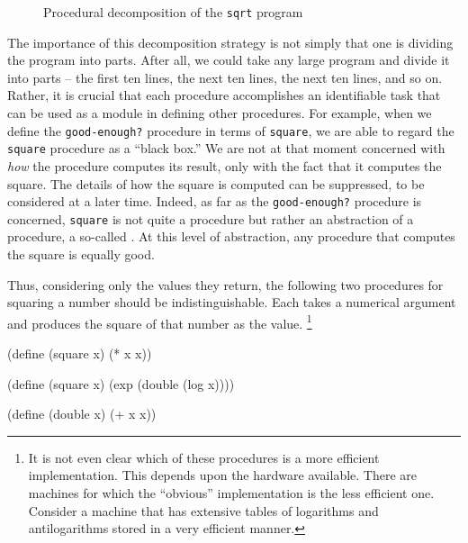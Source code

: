 \begin{schemedisplay}
\begin{figure}
  \caption{Procedural decomposition of the \texttt{sqrt} program}
  \label{fig:1.2}
\end{figure}
          
            
The importance of this decomposition strategy is not simply that one
is dividing the program into parts.  After all, we could take any
large program and divide it into parts -- the first ten lines, the next
ten lines, the next ten lines, and so on.  Rather, it is crucial that
each procedure accomplishes an identifiable task that can be used as a
module in defining other procedures.  For example, when we define the
\texttt{good-enough?} procedure in terms of \texttt{square}, we are able to
regard the \texttt{square} procedure as a ``black box.''  We are not at
that moment concerned with \textit{how} the procedure computes its
result, only with the fact that it computes the square.  The details
of how the square is computed can be suppressed, to be considered at a
later time.  Indeed, as far as the \texttt{good-enough?} procedure is
concerned, \texttt{square} is not quite a procedure but rather an
abstraction of a procedure, a so-called .
At this level of abstraction, any procedure that computes the square
is equally good.

Thus, considering only the values they return, the following two
procedures for squaring a number should be indistinguishable.  Each
takes a numerical argument and produces the square of that number as
the value. \footnote{It is not even clear which of these procedures is
  a more efficient implementation.  This depends upon the hardware
  available.  There are machines for which the ``obvious''
  implementation is the less efficient one.  Consider a machine that
  has extensive tables of logarithms and antilogarithms stored in a
  very efficient manner.}

\begin{schemedisplay}
(define (square x) (* x x))

(define (square x) 
  (exp (double (log x))))

(define (double x) (+ x x))
\end{schemedisplay}


\end{schemedisplay}
